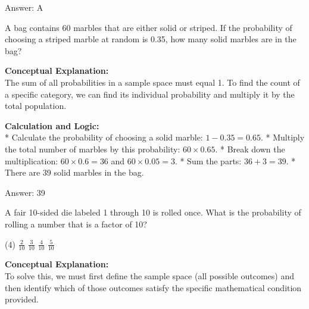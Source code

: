 \documentclass[11pt,paper=a4,answers]{exam}
\begin{document}
\begin{questions}
\begin{solution}
Answer: \colorbox{yellow!100}{A}
\end{solution}

\vspace{60pt}

\question
A bag contains 60 marbles that are either solid or striped. If the probability of choosing a striped marble at random is 0.35, how many solid marbles are in the bag?

\begin{solution}
\textbf{Conceptual Explanation:} \\
The sum of all probabilities in a sample space must equal 1. To find the count of a specific category, we can find its individual probability and multiply it by the total population.

\vspace{30pt}

\textbf{Calculation and Logic:} \\
* Calculate the probability of choosing a solid marble: $1 - 0.35 = 0.65$.
* Multiply the total number of marbles by this probability: $60 \times 0.65$.
* Break down the multiplication: $60 \times 0.6 = 36$ and $60 \times 0.05 = 3$.
* Sum the parts: $36 + 3 = 39$.
* There are 39 solid marbles in the bag.

\vspace{30pt}

Answer: \colorbox{yellow!100}{39}
\end{solution}

\vspace{60pt}

\question
A fair 10-sided die labeled 1 through 10 is rolled once. What is the probability of rolling a number that is a factor of 10?
\begin{tasks}(4)
    \task $\frac{2}{10}$
    \task $\frac{3}{10}$
    \task $\frac{4}{10}$
    \task $\frac{5}{10}$
\end{tasks}

\begin{solution}
\textbf{Conceptual Explanation:} \\
To solve this, we must first define the sample space (all possible outcomes) and then identify which of those outcomes satisfy the specific mathematical condition provided.

\vspace{30pt}


\end{solution}
\end{questions}
\end{document}
